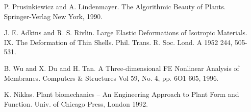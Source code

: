 
\begin{thebibliography}{10}

{\sc P. Prusinkiewicz and A. Lindenmayer}. {The Algorithmic Beauty of Plants}. Springer-Verlag New York, 1990.



{\sc J. E. Adkins and R. S. Rivlin}. {Large Elastic Deformations of Isotropic Materials. IX. The Deformation of Thin Shells}. Phil. Trans. R. Soc. Lond. A 1952 244, 505-531.



{\sc B. Wu and X. Du and H. Tan}. {A Three-dimensional FE Nonlinear Analysis of Membranes}. Computers \& Structures Vol 59, No. 4, pp. 6O1-605, 1996.



{\sc K. Niklas}. {Plant biomechanics -- An Engineering Approach to Plant Form and Function}. Univ. of Chicago Press, London 1992.

\end{thebibliography}
